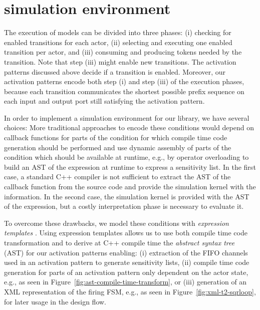 \chapter{\SysteMoC{} simulation environment}\label{sec:systemoc-implementation}

The execution of \SysteMoC{} models can be divided into three phases:
(i)   checking for enabled transitions for each actor,
(ii)  selecting and executing one enabled transition per actor, and
(iii) consuming and producing tokens needed by the transition.
Note that step (iii) might enable new transitions.
The activation patterns discussed above decide if a transition is enabled.
Moreover, our activation patterns encode both step (i) and step (iii) of the execution phases, because each transition communicates the shortest possible prefix sequence on each input and output port still satisfying the activation pattern.

In order to implement a simulation environment for our \SysteMoC{} library, we have several choices:
More traditional approaches to encode these conditions would depend on callback functions for parts of the condition for which compile time code generation should be performed and use dynamic assembly of parts of the condition which should be available at runtime, e.g., by operator overloading to build an AST of the expression at runtime to express a sensitivity list.
In the first case, a standard C++ compiler is not sufficient to extract the AST of the callback function from the source code and provide the simulation kernel with the information.
In the second case, the simulation kernel is provided with the AST of the expression, but a costly interpretation phase is necessary to evaluate it.

To overcome these drawbacks, we model these conditions with \emph{expression templates} \cite{veldhuizen:1995}.
Using expression templates allows us to use both compile time code transformation and to derive at C++ compile time the \emph{abstract syntax tree} (AST) for our activation patterns enabling:
(i) extraction of the FIFO channels used in an activation pattern to generate sensitivity lists,
(ii) compile time code generation for parts of an activation pattern only dependent on the actor state, e.g., as seen in Figure~\ref{fig:ast-compile-time-transform}, or
(iii) generation of an XML representation of the firing FSM, e.g., as seen in Figure~\ref{fig:xml-t2-sqrloop}, for later usage in the design flow.

